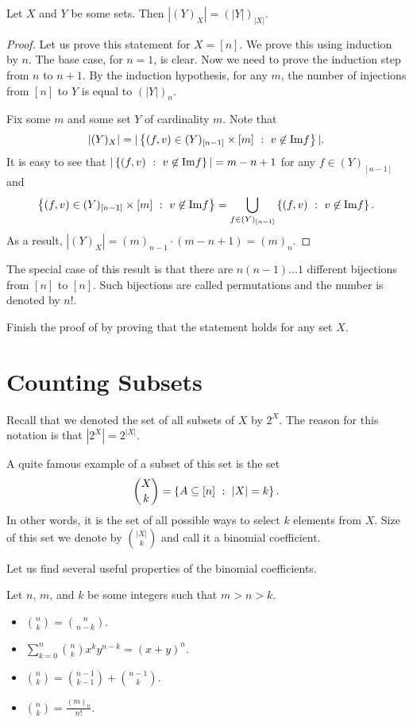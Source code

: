 \begin{theorem}
\label{theorem:number-of-injections}
  Let $X$ and $Y$ be some sets. Then $|(Y)_X| = (|Y|)_{|X|}$.
\end{theorem}
\begin{proof}
  Let us prove this statement for $X = [n]$. We prove this using induction by
  $n$. The base case, for $n = 1$, is clear. Now we need to prove the induction
  step from $n$ to $n + 1$. By the induction hypothesis, for any $m$, the
  number of injections from $[n]$ to $Y$ is equal to $(|Y|)_n$.

  Fix some $m$ and some set $Y$ of cardinality $m$. Note that
  \[
    |(Y)_X| =
    |\set[v \not\in \Im f]{(f, v) \in (Y)_{[n - 1]} \times [m]}|.
  \]
  It is easy to see that $|\set[v \not\in \Im f]{(f, v)}| = m - n + 1$
  for any $f \in (Y)_{[n - 1]}$ and
  \[
    \set[v \not\in \Im f]{(f, v) \in (Y)_{[n - 1]} \times [m]} =
    \bigcup\limits_{f \in (Y)_{[n - 1]}} \set[v \not\in \Im f]{(f, v)}.
  \]
  As a result, $|(Y)_X| = (m)_{n - 1} \cdot (m - n + 1) = (m)_n$.
\end{proof}

The special case of this result is that there are $n (n - 1) \dots 1$ different
bijections from $[n]$ to $[n]$. Such bijections are called permutations and the
number is denoted by $n!$.

\begin{exercise}
  Finish the proof of  by proving that
  the statement holds for any set $X$.
\end{exercise}

\section{Counting Subsets}
Recall that we denoted the set of all subsets of $X$ by $2^X$. The reason for
this notation is that $|2^X| = 2^{|X|}$.

A quite famous example of a subset of this set is the set
\[
  \binom{X}{k} = \set[|X| = k]{A \subseteq [n]}.
\]
In other words, it is the set of all possible ways to select $k$ elements from
$X$. Size of this set we denote by $\binom{|X|}{k}$ and call it a binomial
coefficient.

Let us find several useful properties of the binomial coefficients.
\begin{theorem}
  Let $n$, $m$, and $k$ be some integers such that $m > n > k$.
  \begin{itemize}
    \item $\binom{n}{k} = \binom{n}{n - k}$.
    \item $\sum\limits_{k = 0}^n \binom{n}{k} x^k y^{n - k} = (x + y)^n$.
    \item $\binom{n}{k} = \binom{n - 1}{k - 1} + \binom{n - 1}{k}$.
    \item $\binom{n}{k} = \frac{(m)_n}{n!}$.
  \end{itemize}
\end{theorem}
